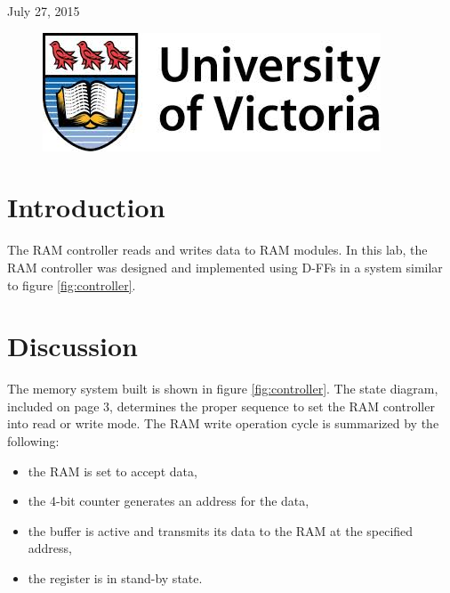 \documentclass[11pt]{article}
\begin{document}
\begin{titlepage}
{\large July 27, 2015}\\ %

\begin{figure}[b]	 %
	\centering
	\includegraphics[scale=0.3]{UVic_logo}
\end{figure}

\end{titlepage}


\section{Introduction}

The RAM controller reads and writes data to RAM modules. In this lab, the RAM controller was designed and implemented using D-FFs in a system similar to figure \ref{fig:controller}. 

\section{Discussion}\label{sec:discussion}

The memory system built is shown in figure \ref {fig:controller}. The state diagram, included on page 3, determines the proper sequence to set the RAM controller into read or write mode. The RAM write operation cycle is summarized by the following: 

\begin{itemize}
 
 	 \item the RAM is set to accept data,
	 \item the 4-bit counter generates an address for the data,
 	 \item the buffer is active and transmits its data to the RAM at the specified address,
	 \item the register is in stand-by state.
	  
\end{itemize}
\end{document}
